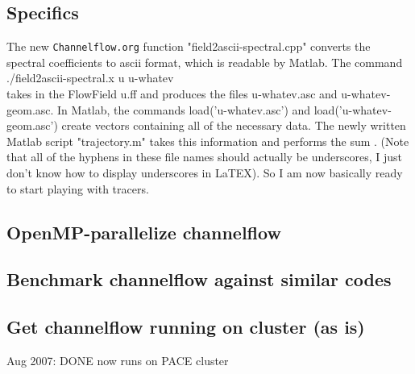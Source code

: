 \subsection{Specifics}

The new {\tt Channelflow.org} function "field2ascii-spectral.cpp" converts the
spectral coefficients to ascii format, which is readable by Matlab.
The command \\ ./field2ascii-spectral.x u u-whatev \\ takes in the
FlowField u.ff and produces the files u-whatev.asc and
u-whatev-geom.asc. In Matlab, the commands load('u-whatev.asc') and
load('u-whatev-geom.asc') create vectors containing all of the
necessary data. The newly written Matlab script "trajectory.m" takes
this information and performs the sum . (Note
that all of the hyphens in these file names should actually be
underscores, I just don't know how to display underscores in LaTEX).
So I am now basically ready to start playing with tracers.


\subsection{OpenMP-parallelize channelflow}
\subsection{Benchmark channelflow against similar codes}

\subsection{Get channelflow running on cluster (as is)}

Aug 2007: DONE now runs on PACE cluster
